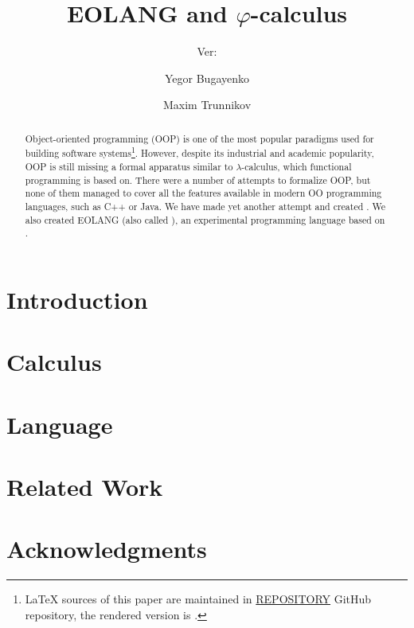 \documentclass[acmsmall,nonacm,11pt]{acmart}
\title{EOLANG and \texorpdfstring{\(\varphi\)}{phi}-calculus}
\subtitle{%
  Ver:
  \texorpdfstring{
    \href{https://github.com/REPOSITORY/releases/tag/0.0.0}
      {\ff{0.0.0}}
  }{0.0.0}
}
\author{Yegor Bugayenko}
\affiliation{\institution{Huawei}\city{Moscow}\country{Russia}}
\author{Maxim Trunnikov}
\affiliation{\institution{Huawei}\city{Moscow}\country{Russia}}
\begin{document}
\begin{abstract}
Object-oriented programming (OOP) is one of the most popular
paradigms used for building software systems\footnote{%
  \LaTeX{} sources of this paper are maintained in
  \href{https://github.com/REPOSITORY}{REPOSITORY} GitHub repository,
  the rendered version is \href{https://github.com/REPOSITORY/releases/tag/0.0.0}{}.}.
However, despite
its industrial and academic popularity, OOP is still missing
a formal apparatus similar to \(\lambda\)-calculus, which functional
programming is based on. There were a number of attempts to formalize
OOP, but none of them managed to cover all the features available in
modern OO programming languages, such as C++ or Java.
We have made yet another attempt and created \phic{}. We also
created EOLANG (also called \eolang{}), an experimental
programming language based on \phic{}.
\end{abstract}

\maketitle

\section{Introduction}
\label{sec:intro}


\section{Calculus}
\label{sec:calculus}


\section{Language}
\label{sec:language}


\section{Related Work}
\label{sec:related}


\section{Acknowledgments}


{\raggedright

}
\vfill\eject

\appendix



\end{document}
